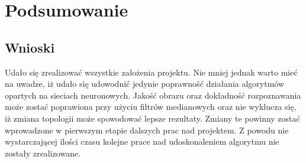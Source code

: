 \chapter{Podsumowanie}
\label{cha:podsumowanie}

\section{Wnioski}
Udało się zrealizować wszystkie założenia projektu. Nie mniej jednak warto mieć na uwadze, iż udało się udowodnić jedynie poprawność działania algorytmów opartych na sieciach neuronowych. Jakość obrazu oraz dokładność rozpoznawania może zostać poprawiona przy użyciu filtrów medianowych oraz nie wyklucza się, iż zmiana topologii może spowodować lepsze rezultaty. Zmiany te powinny zostać wprowadzone w pierwszym etapie dalszych prac nad projektem. Z powodu nie wystarczającej ilości czasu kolejne prace nad udoskonaleniem algorytmu nie zostały zrealizowane.